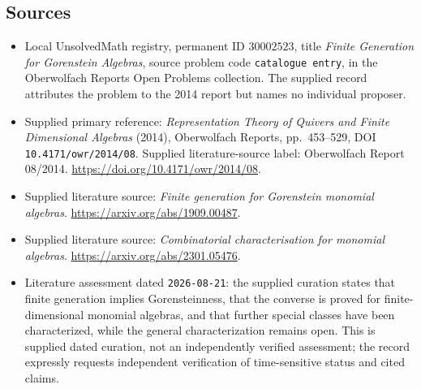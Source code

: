 \documentclass[11pt]{article}
\begin{document}
\subsection{Sources}
\begin{itemize}
\item Local UnsolvedMath registry, permanent ID \(30002523\), title \emph{Finite Generation for Gorenstein Algebras}, source problem code \texttt{catalogue entry}, in the Oberwolfach Reports Open Problems collection. The supplied record attributes the problem to the 2014 report but names no individual proposer.
\item Supplied primary reference: \emph{Representation Theory of Quivers and Finite Dimensional Algebras} (2014), Oberwolfach Reports, pp.\ 453--529, DOI \texttt{10.4171/owr/2014/08}. Supplied literature-source label: Oberwolfach Report 08/2014. \url{https://doi.org/10.4171/owr/2014/08}.
\item Supplied literature source: \emph{Finite generation for Gorenstein monomial algebras}. \url{https://arxiv.org/abs/1909.00487}.
\item Supplied literature source: \emph{Combinatorial characterisation for monomial algebras}. \url{https://arxiv.org/abs/2301.05476}.
\item Literature assessment dated \texttt{2026-08-21}: the supplied curation states that finite generation implies Gorensteinness, that the converse is proved for finite-dimensional monomial algebras, and that further special classes have been characterized, while the general characterization remains open. This is supplied dated curation, not an independently verified assessment; the record expressly requests independent verification of time-sensitive status and cited claims.
\end{itemize}
\end{document}
